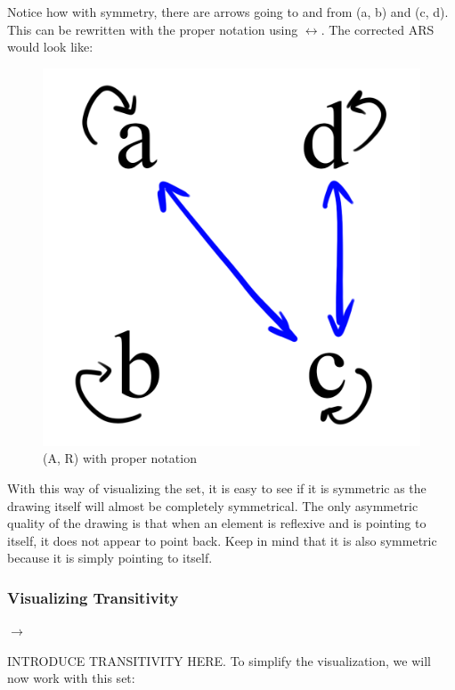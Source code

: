 \documentclass{article}
\begin{document}
{\medskip\noindent
Notice how with symmetry, there are arrows going to and from (a, b) and (c, d). This can be rewritten with the proper notation using $\leftrightarrow$. The corrected ARS would look like:

\begin{figure}[h!]
  \centering
  \includegraphics[scale=0.06]{v3}
  \caption[] {
     (A, R) with proper notation
    \endtabular}
\end{figure}

\medskip\noindent
With this way of visualizing the set, it is easy to see if it is symmetric as the drawing itself will almost be completely symmetrical. The only asymmetric quality of the drawing is that when an element is reflexive and is pointing to itself, it does not appear to point back. Keep in mind that it is also symmetric because it is simply pointing to itself.

\subsubsection{Visualizing Transitivity}
$\xrightarrow{\text{}}$

\medskip\noindent
INTRODUCE TRANSITIVITY HERE. To simplify the visualization, we will now work with this set:

}
\end{document}
